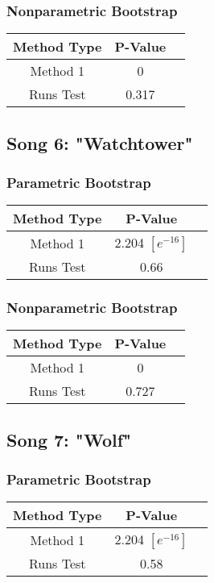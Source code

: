 \documentclass[12pt, letterpaper]{article}
\begin{document}
\subsubsection{Nonparametric Bootstrap}
\begin{tabular}{|c|c|c|}
\hline
\textbf{Method Type} & P-Value \\
\hline
Method 1 & 0  \\
\hline
Runs Test & 0.317 \\ 
\hline
\end{tabular}

\subsection{Song 6: "Watchtower"}
\subsubsection{Parametric Bootstrap}

\begin{tabular}{|c|c|c|}
\hline
\textbf{Method Type} & P-Value  \\
\hline
Method 1 & 2.204 $[e^{-16}]$ \\
\hline
Runs Test & 0.66 \\ 
\hline
\end{tabular}

\subsubsection{Nonparametric Bootstrap}
\begin{tabular}{|c|c|c|}
\hline
\textbf{Method Type} & P-Value \\
\hline
Method 1 & 0  \\
\hline
Runs Test & 0.727 \\ 
\hline
\end{tabular}

\subsection{Song 7: "Wolf"}
\subsubsection{Parametric Bootstrap}

\begin{tabular}{|c|c|c|}
\hline
\textbf{Method Type} & P-Value  \\
\hline
Method 1 & 2.204 $[e^{-16}]$ \\
\hline
Runs Test & 0.58 \\ 
\hline
\end{tabular}
\end{document}
